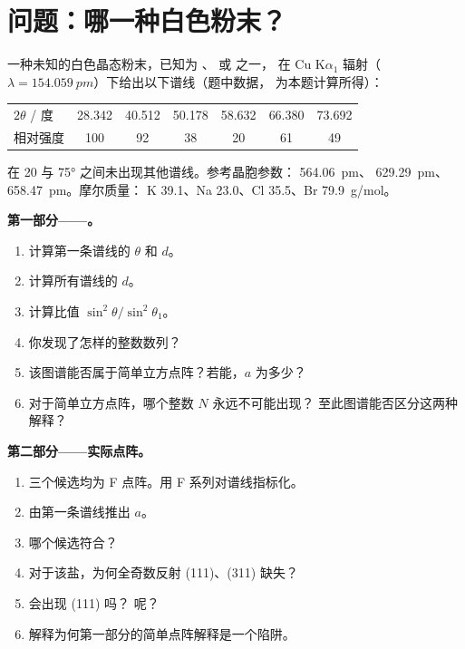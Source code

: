 \clearpage
\enlargethispage{3\baselineskip}
\section{问题：哪一种白色粉末？}

\begin{problem}
\label{pb:b3:x-ray-diffraction:1}
一种未知的白色晶态粉末，已知为 、 或  之一，
在 Cu K$\alpha_1$ 辐射（$\lambda = \qty{154.059}{pm}$）下给出以下谱线（题中数据，
为本题计算所得）：
\begin{center}\small
\begin{tabular}{lcccccc}
\hline
$2\theta$ / 度 & 28.342 & 40.512 & 50.178 & 58.632 & 66.380 & 73.692 \\
相对强度 & 100 & 92 & 38 & 20 & 61 & 49 \\ \hline
\end{tabular}
\end{center}
在 20 与 \ang{75} 之间未出现其他谱线。参考晶胞参数：
 \qty{564.06}{pm}、 \qty{629.29}{pm}、 \qty{658.47}{pm}。摩尔质量：
K 39.1、Na 23.0、Cl 35.5、Br \qty{79.9}{g/mol}。

\medskip\noindent\textbf{第一部分——。}
\begin{enumerate}
  \item 计算第一条谱线的 $\theta$ 和 $d$。
  \item 计算所有谱线的 $d$。
  \item 计算比值 $\sin^2\theta/\sin^2\theta_1$。
  \item 你发现了怎样的整数数列？
  \item 该图谱能否属于简单立方点阵？若能，$a$ 为多少？
  \item 对于简单立方点阵，哪个整数 $N$ 永远不可能出现？
        至此图谱能否区分这两种解释？
\end{enumerate}

\medskip\noindent\textbf{第二部分——实际点阵。}
\begin{enumerate}[resume]
  \item 三个候选均为 F 点阵。用 F 系列对谱线指标化。
  \item 由第一条谱线推出 $a$。
  \item 哪个候选符合？
  \item 对于该盐，为何全奇数反射 (111)、(311) 缺失？
  \item {} 会出现 (111) 吗？ 呢？
  \item 解释为何第一部分的简单点阵解释是一个陷阱。
\end{enumerate}


\end{problem}
